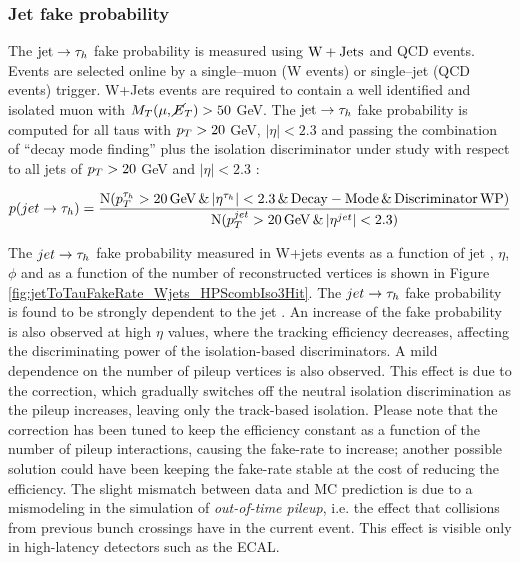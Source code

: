 \subsubsection{Jet fake probability}

The $\mathrm{jet} \rightarrow \tau_h$ fake probability is measured using $\mathrm{W}+\mathrm{Jets}$ and QCD events. Events are selected online by a single--muon (W events) or single--jet (QCD events) trigger. W+Jets events are required to contain a well identified and isolated muon with $M_T(\mu, \cancel{E}_T) > 50$ GeV. The $\mathrm{jet} \rightarrow \tau_h$ fake probability is computed for all taus with $p_{T} > 20$ GeV, $|\eta| < 2.3$ and passing the combination of ``decay mode finding'' plus the isolation discriminator under study with respect to all jets of $p_{T} > 20$ GeV and $|\eta| < 2.3$ \cite{DP-14-015}:

\begin{equation}
 p(jet \rightarrow \tau_h) = \dfrac{\operatorname{N}(p_{T}^{\tau_h} > 20\, \mathrm{GeV} \, \& \, |\eta^{\tau_h}| < 2.3 \, \& \, \mathrm{Decay-Mode} \, \& \, \mathrm{Discriminator\,WP})}{\operatorname{N}(p_{T}^{jet} > 20\, \mathrm{GeV} \, \& \, |\eta^{jet}| < 2.3)}
\end{equation}

The $jet \rightarrow \tau_h$ fake probability measured in W+jets events as a function of jet \pT, $\eta$, $\phi$ and as a function of the number of reconstructed vertices is shown in Figure \ref{fig:jetToTauFakeRate_Wjets_HPScombIso3Hit}. The $jet \rightarrow \tau_h$ fake probability is found to be strongly dependent to the jet \pT. An increase of the fake probability is also observed at high $\eta$ values, where the tracking efficiency decreases, affecting the discriminating power of the isolation-based discriminators. A mild dependence on the number of pileup vertices is also observed. This effect is due to the \db correction, which gradually switches off the neutral isolation discrimination as the pileup increases, leaving only the track-based isolation. Please note that the \db correction has been tuned to keep the efficiency constant as a function of the number of pileup interactions, causing the fake-rate to increase; another possible solution could have been keeping the fake-rate stable at the cost of reducing the efficiency. The slight mismatch between data and MC prediction is due to a mismodeling in the simulation of \emph{out-of-time pileup}, i.e. the effect that collisions from previous bunch crossings have in the current event. This effect is visible only in high-latency detectors such as the ECAL.

